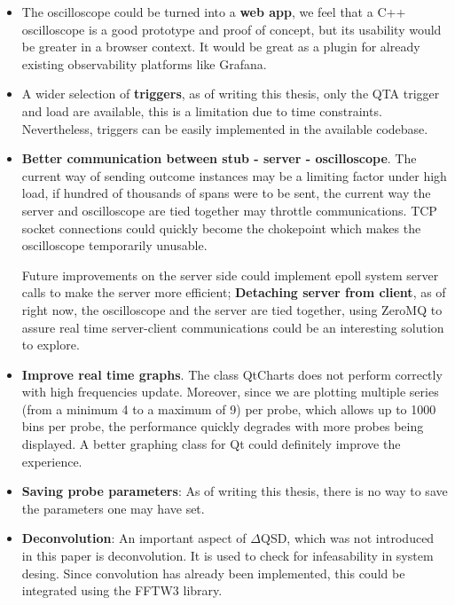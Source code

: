            \begin{itemize}
            
                \item The oscilloscope could be turned into a \textbf{web app}, we feel that a C++ oscilloscope is a good prototype and proof of concept, but its usability would be greater in a browser context. It would be great as a plugin for already existing observability platforms like Grafana.
            
                \item A wider selection of \textbf{triggers}, as of writing this thesis, only the QTA trigger and load are available, this is a limitation due to time constraints. Nevertheless, triggers can be easily implemented in the available codebase.
            
                \item \textbf{Better communication between stub - server - oscilloscope}. The current way of sending outcome instances may be a limiting factor under high load, if hundred of thousands of spans were to be sent, the current way the server and oscilloscope are tied together may throttle communications. TCP socket connections could quickly become the chokepoint which makes the oscilloscope temporarily unusable.

            Future improvements on the server side could implement epoll system server calls to make the server more efficient; \textbf{Detaching server from client}, as of right now, the oscilloscope and the server are tied together, using ZeroMQ to assure real time server-client communications could be an interesting solution to explore.

                \item \textbf{Improve real time graphs}. The class QtCharts does not perform correctly with high frequencies update. Moreover, since we are plotting multiple series (from a minimum 4 to a maximum of 9) per probe, which allows up to 1000 bins per probe, the performance quickly degrades with more probes being displayed. A better graphing class for Qt could definitely improve the experience.

                \item \textbf{Saving probe parameters}: As of writing this thesis, there is no way to save the parameters one may have set. 
           
                \item \textbf{Deconvolution}: An important aspect of $\Delta$QSD, which was not introduced in this paper is deconvolution. It is used to check for infeasability in system desing. Since convolution has already been implemented, this could be integrated using the FFTW3 library. 


\end{itemize}
